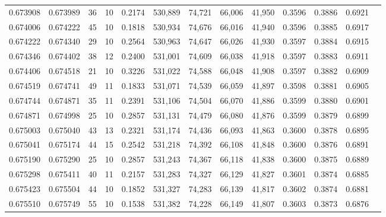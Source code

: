 \begin{tabular}{rrrrrrrrrrrrr}
0.673908 & 0.673989 &    36 &  10 &                                     0.2174 & 530,889 &  74,721 &  66,006 &  41,950 & 0.3596 & 0.3886 & 0.6921 \\
0.674006 & 0.674222 &    45 &  10 &                                     0.1818 & 530,934 &  74,676 &  66,016 &  41,940 & 0.3596 & 0.3885 & 0.6917 \\
0.674222 & 0.674340 &    29 &  10 &                                     0.2564 & 530,963 &  74,647 &  66,026 &  41,930 & 0.3597 & 0.3884 & 0.6915 \\
0.674346 & 0.674402 &    38 &  12 &                                     0.2400 & 531,001 &  74,609 &  66,038 &  41,918 & 0.3597 & 0.3883 & 0.6911 \\
0.674406 & 0.674518 &    21 &  10 &                                     0.3226 & 531,022 &  74,588 &  66,048 &  41,908 & 0.3597 & 0.3882 & 0.6909 \\
0.674519 & 0.674741 &    49 &  11 &                                     0.1833 & 531,071 &  74,539 &  66,059 &  41,897 & 0.3598 & 0.3881 & 0.6905 \\
0.674744 & 0.674871 &    35 &  11 &                                     0.2391 & 531,106 &  74,504 &  66,070 &  41,886 & 0.3599 & 0.3880 & 0.6901 \\
0.674871 & 0.674998 &    25 &  10 &                                     0.2857 & 531,131 &  74,479 &  66,080 &  41,876 & 0.3599 & 0.3879 & 0.6899 \\
0.675003 & 0.675040 &    43 &  13 &                                     0.2321 & 531,174 &  74,436 &  66,093 &  41,863 & 0.3600 & 0.3878 & 0.6895 \\
0.675041 & 0.675174 &    44 &  15 &                                     0.2542 & 531,218 &  74,392 &  66,108 &  41,848 & 0.3600 & 0.3876 & 0.6891 \\
0.675190 & 0.675290 &    25 &  10 &                                     0.2857 & 531,243 &  74,367 &  66,118 &  41,838 & 0.3600 & 0.3875 & 0.6889 \\
0.675298 & 0.675411 &    40 &  11 &                                     0.2157 & 531,283 &  74,327 &  66,129 &  41,827 & 0.3601 & 0.3874 & 0.6885 \\
0.675423 & 0.675504 &    44 &  10 &                                     0.1852 & 531,327 &  74,283 &  66,139 &  41,817 & 0.3602 & 0.3874 & 0.6881 \\
0.675510 & 0.675749 &    55 &  10 &                                     0.1538 & 531,382 &  74,228 &  66,149 &  41,807 & 0.3603 & 0.3873 & 0.6876 \\

\end{tabular}
